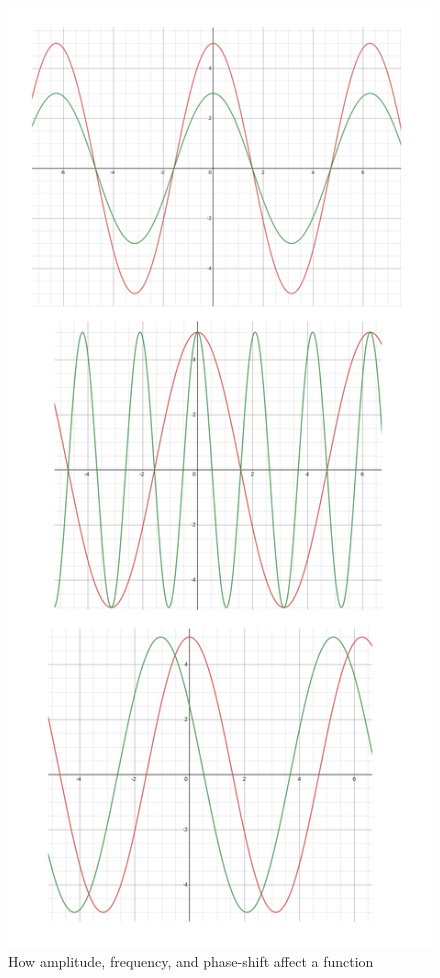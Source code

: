 \documentclass[journal]{IEEEtran}
\begin{document}
	\begin{figure}
		\centering
		\includegraphics[scale=0.6]{ACShifts.png}
		\caption{How amplitude, frequency, and phase-shift affect a function}
		\label{fig:acpower}
	\end{figure}
\end{document}
